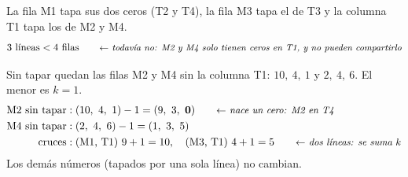 \documentclass[11pt,a4paper]{article}
\let\pasobase\paso
\renewcommand{\paso}[1]{\needspace{7\baselineskip}\pasobase{#1}}
\newcommand{\marco}[3]{%
  \foreach \i in {2,...,#2} \foreach \j in {2,...,#3}
    \draw[gray!60, very thin] (#1-\i-\j.north west) rectangle (#1-\i-\j.south east);
  \draw[semithick] (#1-2-2.north west) rectangle (#1-#2-#3.south east);}
\newcommand{\tfila}[3]{\draw[tapa] (#1-#2-2.west) -- (#1-#2-#3.east);}
\newcommand{\tcol}[3]{\draw[tapa] (#1-2-#2.north) -- (#1-#3-#2.south);}
\newcommand{\pie}[2]{\node[below=1.5mm of #1, font=\scriptsize\itshape] {#2};}
\newcommand{\flecha}[3]{\draw[-{Stealth[length=2.4mm]}, thick, shorten >=1mm] (#1.east) -- node[above, font=\scriptsize, align=center] {#3} (#1.east -| #2.west);}
\begin{document}
\begin{center}
\end{center}
La fila M1 tapa sus dos ceros (T2 y T4), la fila M3 tapa el de T3 y la columna T1 tapa los de M2 y M4.
\[
3 \text{ líneas} < 4 \text{ filas} \nota{todavía no: M2 y M4 solo tienen ceros en T1, y no pueden compartirlo}
\]

Sin tapar quedan las filas M2 y M4 sin la columna T1: $10,\ 4,\ 1$ y $2,\ 4,\ 6$. El menor es $k = 1$.
\begin{align*}
\text{M2 sin tapar} &: (10,\ 4,\ 1) - 1 = (9,\ 3,\ \mathbf{0}) \nota{nace un cero: M2 en T4}\\
\text{M4 sin tapar} &: (2,\ 4,\ 6) - 1 = (1,\ 3,\ 5)\\
\text{cruces} &: (\text{M1, T1})\ 9 + 1 = 10, \quad (\text{M3, T1})\ 4 + 1 = 5 \nota{dos líneas: se suma $k$}
\end{align*}
Los demás números (tapados por una sola línea) no cambian.
\end{document}
